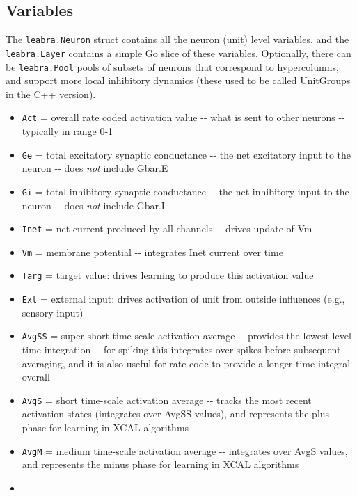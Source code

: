 \hypertarget{variables}{%
\subsection{Variables}\label{variables}}

The \texttt{leabra.Neuron} struct contains all the neuron (unit) level
variables, and the \texttt{leabra.Layer} contains a simple Go slice of
these variables. Optionally, there can be \texttt{leabra.Pool} pools of
subsets of neurons that correspond to hypercolumns, and support more
local inhibitory dynamics (these used to be called UnitGroups in the C++
version).

\begin{itemize}
\tightlist
\item
  \texttt{Act} = overall rate coded activation value -\/- what is sent
  to other neurons -\/- typically in range 0-1
\item
  \texttt{Ge} = total excitatory synaptic conductance -\/- the net
  excitatory input to the neuron -\/- does \emph{not} include Gbar.E
\item
  \texttt{Gi} = total inhibitory synaptic conductance -\/- the net
  inhibitory input to the neuron -\/- does \emph{not} include Gbar.I
\item
  \texttt{Inet} = net current produced by all channels -\/- drives
  update of Vm
\item
  \texttt{Vm} = membrane potential -\/- integrates Inet current over
  time
\item
  \texttt{Targ} = target value: drives learning to produce this
  activation value
\item
  \texttt{Ext} = external input: drives activation of unit from outside
  influences (e.g., sensory input)
\item
  \texttt{AvgSS} = super-short time-scale activation average -\/-
  provides the lowest-level time integration -\/- for spiking this
  integrates over spikes before subsequent averaging, and it is also
  useful for rate-code to provide a longer time integral overall
\item
  \texttt{AvgS} = short time-scale activation average -\/- tracks the
  most recent activation states (integrates over AvgSS values), and
  represents the plus phase for learning in XCAL algorithms
\item
  \texttt{AvgM} = medium time-scale activation average -\/- integrates
  over AvgS values, and represents the minus phase for learning in XCAL
  algorithms
\item

\end{itemize}
